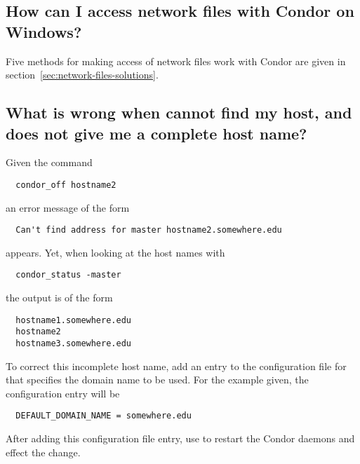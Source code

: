 \subsection*{How can I access network files with Condor on Windows?}

Five methods for making access of network files work with Condor
are given in 
section~\ref{sec:network-files-solutions}.

\subsection*{What is wrong when  cannot find my host, and  does not give me a complete host name?}

Given the command
\begin{verbatim}
  condor_off hostname2
\end{verbatim}
an error message of the form
\begin{verbatim}
  Can't find address for master hostname2.somewhere.edu
\end{verbatim}
appears.
Yet, when looking at the host names with
\begin{verbatim}
  condor_status -master
\end{verbatim}
the output is of the form 
\begin{verbatim}
  hostname1.somewhere.edu
  hostname2
  hostname3.somewhere.edu
\end{verbatim}

To correct this incomplete host name, add an entry to the
configuration file for
that specifies the domain name to be used.
For the example given, the configuration entry will be
\begin{verbatim}
  DEFAULT_DOMAIN_NAME = somewhere.edu
\end{verbatim}

After adding this configuration file entry, use 
to restart the Condor daemons and effect the change.

%

